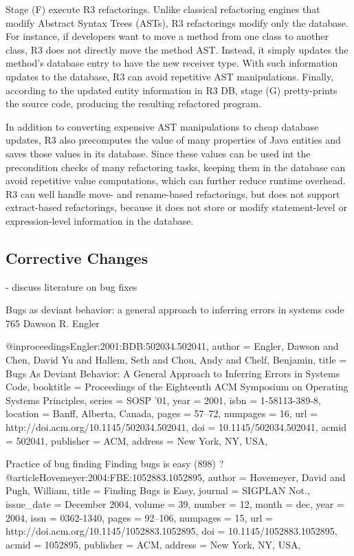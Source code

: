 \documentclass[runningheads,a4paper]{llncs}
\begin{document}
Stage (F) execute R3 refactorings. Unlike classical refactoring engines that modify Abstract Syntax Trees (ASTs), R3 refactorings modify only the database. For instance, if developers want to move a method from one class to another class, R3 does not directly move the method AST. Instead, it simply updates the method's database entry to have the new receiver type. With such information updates to the database, R3 can avoid repetitive AST manipulations. Finally, according to the updated entity information in R3 DB, stage (G) pretty-prints the source code, producing the resulting refactored program.

In addition to converting expensive AST manipulations to cheap database updates, R3 also precomputes the value of many properties of Java entities and saves those values in its database. Since these values can be used int the precondition checks of many refactoring tasks, keeping them in the database can avoid repetitive value computations, which can further reduce runtime overhead. R3 can well handle move- and rename-based refactorings, but does not support extract-based refactorings, because it does not store or modify statement-level or expression-level information in the database.  
\subsection{Corrective Changes} 
	- discuss literature on bug fixes  



Bugs as deviant behavior: a general approach to inferring errors in systems code  765 Dawson R. Engler

@inproceedings{Engler:2001:BDB:502034.502041,
 author = {Engler, Dawson and Chen, David Yu and Hallem, Seth and Chou, Andy and Chelf, Benjamin},
 title = {Bugs As Deviant Behavior: A General Approach to Inferring Errors in Systems Code},
 booktitle = {Proceedings of the Eighteenth ACM Symposium on Operating Systems Principles},
 series = {SOSP '01},
 year = {2001},
 isbn = {1-58113-389-8},
 location = {Banff, Alberta, Canada},
 pages = {57--72},
 numpages = {16},
 url = {http://doi.acm.org/10.1145/502034.502041},
 doi = {10.1145/502034.502041},
 acmid = {502041},
 publisher = {ACM},
 address = {New York, NY, USA},
} 


Practice of bug finding
Finding bugs is easy (898) ?
@article{Hovemeyer:2004:FBE:1052883.1052895,
 author = {Hovemeyer, David and Pugh, William},
 title = {Finding Bugs is Easy},
 journal = {SIGPLAN Not.},
 issue_date = {December 2004},
 volume = {39},
 number = {12},
 month = dec,
 year = {2004},
 issn = {0362-1340},
 pages = {92--106},
 numpages = {15},
 url = {http://doi.acm.org/10.1145/1052883.1052895},
 doi = {10.1145/1052883.1052895},
 acmid = {1052895},
 publisher = {ACM},
 address = {New York, NY, USA},
} 
\end{document}
